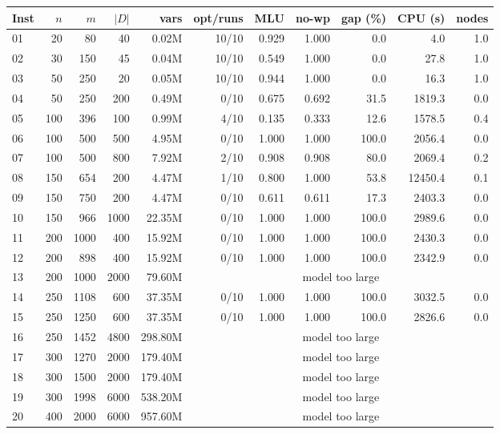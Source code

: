 \begin{tabular}{lrrrrrrrrrr}
\toprule
Inst & $n$ & $m$ & $|D|$ & vars & opt/runs & MLU & no-wp & gap (\%) & CPU (s) & nodes \\
\midrule
01 & 20 & 80 & 40 & 0.02M & 10/10 & 0.929 & 1.000 & 0.0 & 4.0 & 1.0 \\
02 & 30 & 150 & 45 & 0.04M & 10/10 & 0.549 & 1.000 & 0.0 & 27.8 & 1.0 \\
03 & 50 & 250 & 20 & 0.05M & 10/10 & 0.944 & 1.000 & 0.0 & 16.3 & 1.0 \\
04 & 50 & 250 & 200 & 0.49M & 0/10 & 0.675 & 0.692 & 31.5 & 1819.3 & 0.0 \\
05 & 100 & 396 & 100 & 0.99M & 4/10 & 0.135 & 0.333 & 12.6 & 1578.5 & 0.4 \\
06 & 100 & 500 & 500 & 4.95M & 0/10 & 1.000 & 1.000 & 100.0 & 2056.4 & 0.0 \\
07 & 100 & 500 & 800 & 7.92M & 2/10 & 0.908 & 0.908 & 80.0 & 2069.4 & 0.2 \\
08 & 150 & 654 & 200 & 4.47M & 1/10 & 0.800 & 1.000 & 53.8 & 12450.4 & 0.1 \\
09 & 150 & 750 & 200 & 4.47M & 0/10 & 0.611 & 0.611 & 17.3 & 2403.3 & 0.0 \\
10 & 150 & 966 & 1000 & 22.35M & 0/10 & 1.000 & 1.000 & 100.0 & 2989.6 & 0.0 \\
11 & 200 & 1000 & 400 & 15.92M & 0/10 & 1.000 & 1.000 & 100.0 & 2430.3 & 0.0 \\
12 & 200 & 898 & 400 & 15.92M & 0/10 & 1.000 & 1.000 & 100.0 & 2342.9 & 0.0 \\
13 & 200 & 1000 & 2000 & 79.60M & \multicolumn{6}{c}{model too large} \\
14 & 250 & 1108 & 600 & 37.35M & 0/10 & 1.000 & 1.000 & 100.0 & 3032.5 & 0.0 \\
15 & 250 & 1250 & 600 & 37.35M & 0/10 & 1.000 & 1.000 & 100.0 & 2826.6 & 0.0 \\
16 & 250 & 1452 & 4800 & 298.80M & \multicolumn{6}{c}{model too large} \\
17 & 300 & 1270 & 2000 & 179.40M & \multicolumn{6}{c}{model too large} \\
18 & 300 & 1500 & 2000 & 179.40M & \multicolumn{6}{c}{model too large} \\
19 & 300 & 1998 & 6000 & 538.20M & \multicolumn{6}{c}{model too large} \\
20 & 400 & 2000 & 6000 & 957.60M & \multicolumn{6}{c}{model too large} \\
\bottomrule
\end{tabular}
